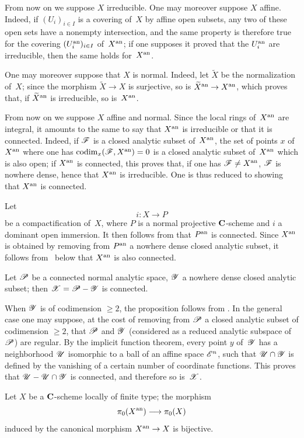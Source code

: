 From
now on we suppose $X$ irreducible. One may moreover suppose
$X$ affine. Indeed, if $(U_i)_{i \in I}$ is a covering of~$X$
by affine open subsets, any two of these open sets have a nonempty
intersection, and the same property is therefore true for the
covering $(U_{i}^{\mathrm{an}})_{i \in I} $ of~$X^{\mathrm{an}}$; if one supposes it
proved that the $U_{i}^{\mathrm{an}} $ are irreducible, then the same
holds for~$X^{\mathrm{an}}$.

One may moreover suppose that $X$ is normal. Indeed, let $\tilde X$ be
the normalization of~$X$; since the morphism $\tilde X \to X$ is
surjective, so is $\tilde X^\an \to X^\an$, which
proves that, if $\widetilde X^{\mathrm{an}} $ is irreducible, so
is~$X^{\mathrm{an}}$.

From now on we suppose $X$ affine and normal. Since the local rings
of~$X^{\mathrm{an}}$ are integral, it amounts to the same to say that
$X^{\mathrm{an}}$ is irreducible or that it is connected. Indeed, if
$\cal{F}$ is a closed analytic subset of~$X^{\mathrm{an}}$, the set
of points $x$ of~$X^{\mathrm{an}}$ where one has $\codim_x (\cal{F}, X^\an ) =
0$ is a closed analytic subset of~$X^{\mathrm{an}}$ \cite[ A
Cor]{XII.4} which is also open; if $X^{\mathrm{an}}$ is connected, this proves that,
if one has $\cal{F} \neq X^\an$, $\cal{F}$ is nowhere dense, hence that $X^{\mathrm{an}}$
is irreducible. One is thus reduced to showing that
$X^{\mathrm{an}}$ is connected.

Let
$$
i \colon X \to P
$$
be a compactification of~$X$, where $P$ is a normal projective
$\mathbf{C}$-scheme and $i$ a dominant open immersion. It then
follows from \cite[ th]{XII.10} that $P^{\mathrm{an}}$ is connected. Since
$X^{\mathrm{an}}$ is obtained by removing from $P^{\mathrm{an}}$ a nowhere dense closed
analytic subset, it follows from~ below that $X^{\mathrm{an}}$
is also connected.

\begin{lemma}
\label{XII.2.5}
Let
$\cal{P} $ be a connected normal analytic space, $\cal{Y}$ a
nowhere dense closed analytic subset; then $\cal{X} = \cal{P} - \cal{Y}$
is connected.
\end{lemma}

When $\cal{Y}$ is of codimension $\geq 2$, the proposition
follows from \cite[ prop]{XII.11}. In the general case one may
suppose, at the cost of removing from $\cal{P}$ a closed analytic
subset of codimension $\geq 2$, that $\cal{P}$ and $\cal{Y}$
(considered as a reduced analytic subspace of~$\cal{P}$) are regular.
By the implicit function theorem, every point $y$ of~$\cal{Y}$ has a
neighborhood $\cal{U}$ isomorphic to a ball of an affine space
$\cal{E}^{n}$, such that $\cal{U} \cap \cal{Y}$ is defined by
the vanishing of a certain number of coordinate functions. This
proves that $\cal{U} - \cal{U} \cap \cal{Y}$ is connected, and
therefore so is~$\cal{X}$.

\begin{corollary}
\label{XII.2.6} Let $X$ be a $\mathbf{C}$-scheme locally of finite
type; the morphism
$$
\pi_0 (X^{\an}) \to \pi_0 (X)
$$
induced by the canonical morphism $X^\an \to X$ is bijective.
\end{corollary}
